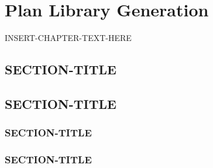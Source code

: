 \chapter{Plan Library Generation}
\thispagestyle{plain}

\label{ch:library-generation}

INSERT-CHAPTER-TEXT-HERE

\section{SECTION-TITLE}
\label{SECTION-LABEL}

\section{SECTION-TITLE}
\label{SECTION-LABEL}

\subsection{SECTION-TITLE}
\label{SECTION-LABEL}

\subsection{SECTION-TITLE}
\label{SECTION-LABEL}
